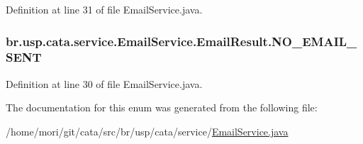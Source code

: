 Definition at line 31 of file Email\+Service.\+java.

\hypertarget{enumbr_1_1usp_1_1cata_1_1service_1_1_email_service_1_1_email_result_a5636f9549a9ece7eec4cc3ed691ad137}{
\subsubsection[{N\+O\+\_\+\+E\+M\+A\+I\+L\+\_\+\+S\+E\+N\+T}]{\setlength{\rightskip}{0pt plus 5cm}br.\+usp.\+cata.\+service.\+Email\+Service.\+Email\+Result.\+N\+O\+\_\+\+E\+M\+A\+I\+L\+\_\+\+S\+E\+N\+T}}\label{enumbr_1_1usp_1_1cata_1_1service_1_1_email_service_1_1_email_result_a5636f9549a9ece7eec4cc3ed691ad137}


Definition at line 30 of file Email\+Service.\+java.



The documentation for this enum was generated from the following file\+:\begin{DoxyCompactItemize}
\item 
/home/mori/git/cata/src/br/usp/cata/service/\hyperlink{_email_service_8java}{Email\+Service.\+java}\end{DoxyCompactItemize}
